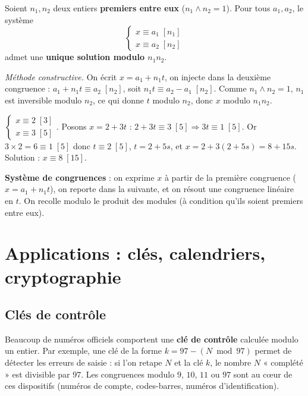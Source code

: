 \begin{theoreme}
Soient $n_1,n_2$ deux entiers \textbf{premiers entre eux} ($n_1\wedge n_2=1$). Pour tous
$a_1,a_2$, le système
\[
\begin{cases}x\equiv a_1\;[n_1]\\ x\equiv a_2\;[n_2]\end{cases}
\]
admet une \textbf{unique solution modulo $n_1n_2$}.
\end{theoreme}

\begin{remarque}
\textit{Méthode constructive.} On écrit $x=a_1+n_1t$, on injecte dans la deuxième congruence :
$a_1+n_1t\equiv a_2\;[n_2]$, soit $n_1t\equiv a_2-a_1\;[n_2]$. Comme $n_1\wedge n_2=1$, $n_1$
est inversible modulo $n_2$, ce qui donne $t$ modulo $n_2$, donc $x$ modulo $n_1n_2$.
\end{remarque}

\begin{exemple}
$\begin{cases}x\equiv2\;[3]\\ x\equiv3\;[5]\end{cases}$. Posons $x=2+3t$ :
$2+3t\equiv3\;[5]\Rightarrow3t\equiv1\;[5]$. Or $3\times2=6\equiv1\;[5]$ donc $t\equiv2\;[5]$,
$t=2+5s$, et $x=2+3(2+5s)=8+15s$. Solution : $x\equiv8\;[15]$.
\end{exemple}

\begin{aretenir}
\textbf{Système de congruences} : on exprime $x$ à partir de la première congruence
($x=a_1+n_1t$), on reporte dans la suivante, et on résout une congruence linéaire en $t$.
On recolle modulo le produit des modules (à condition qu'ils soient premiers entre eux).
\end{aretenir}

\section{Applications : clés, calendriers, cryptographie}

\subsection{Clés de contrôle}

\begin{remarque}
Beaucoup de numéros officiels comportent une \textbf{clé de contrôle} calculée modulo un
entier. Par exemple, une clé de la forme $k=97-(N \bmod 97)$ permet de détecter les erreurs de
saisie : si l'on retape $N$ et la clé $k$, le nombre $N$ « complété » est divisible par $97$.
Les congruences modulo $9$, $10$, $11$ ou $97$ sont au cœur de ces dispositifs (numéros de
compte, codes-barres, numéros d'identification).
\end{remarque}

